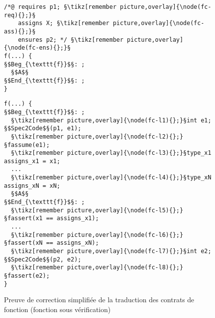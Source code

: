 \begin{figure}[bt]
  \begin{minipage}{0.65\textwidth}
    \begin{lstlisting}[escapechar=§]
/*@ requires p1; §\tikz[remember picture,overlay]{\node(fc-req){};}§
    assigns X; §\tikz[remember picture,overlay]{\node(fc-ass){};}§
    ensures p2; */ §\tikz[remember picture,overlay]{\node(fc-ens){};}§
f(...) {
§$Beg_{\texttt{f}}$§: ;
  §$A$§
§$End_{\texttt{f}}$§: ;
}
    \end{lstlisting}
  \end{minipage}\hfill
  \begin{minipage}{0.49\textwidth}
    \begin{lstlisting}[escapechar=§]
f(...) {
§$Beg_{\texttt{f}}$§: ;
  §\tikz[remember picture,overlay]{\node(fc-l1){};}§int e1; §$Spec2Code$§(p1, e1);
  §\tikz[remember picture,overlay]{\node(fc-l2){};}§fassume(e1);
  §\tikz[remember picture,overlay]{\node(fc-l3){};}§type_x1 assigns_x1 = x1;
  ...
  §\tikz[remember picture,overlay]{\node(fc-l4){};}§type_xN assigns_xN = xN;
  §$A$§
§$End_{\texttt{f}}$§: ;
  §\tikz[remember picture,overlay]{\node(fc-l5){};}§fassert(x1 == assigns_x1);
  ...
  §\tikz[remember picture,overlay]{\node(fc-l6){};}§fassert(xN == assigns_xN);
  §\tikz[remember picture,overlay]{\node(fc-l7){};}§int e2; §$Spec2Code$§(p2, e2);
  §\tikz[remember picture,overlay]{\node(fc-l8){};}§fassert(e2);
}
    \end{lstlisting}
  \end{minipage}
  \caption{Preuve de correction simplifiée de la traduction des contrats de
    fonction (fonction sous vérification)}
  \label{fig:proof-fct-contract-main}
\end{figure}
